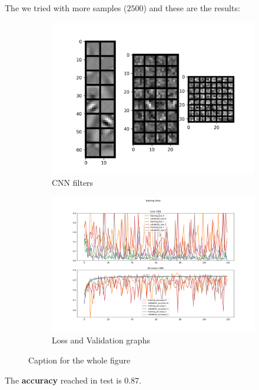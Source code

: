 \documentclass{report}
\begin{document}
\pagebreak

The we tried with more samples ($2500$) and these are the results:\\
\begin{figure}[t!]
  \centering
  \hspace{-2cm}
  \begin{subfigure}[t]{0.49\textwidth}
    \centering
    \includegraphics[width=1.3\textwidth]{4.CNN_2500_sample/CNN_filters.png}
    \caption{CNN filters}
    \label{fig:image-set2-sub1}
  \end{subfigure}
  \hspace{-0.5cm}
  \begin{subfigure}[t]{0.49\textwidth}
    \centering
    \includegraphics[width=1.3\textwidth]{4.CNN_2500_sample/training_infos.png}
    \caption{Loss and Validation graphs}
    \label{fig:image-set2-sub2}
  \end{subfigure}

  \caption{Caption for the whole figure}
  \label{fig:image-set2}
\end{figure}
The \textbf{accuracy} reached in test is $0.87$.\\
\pagebreak
\end{document}
